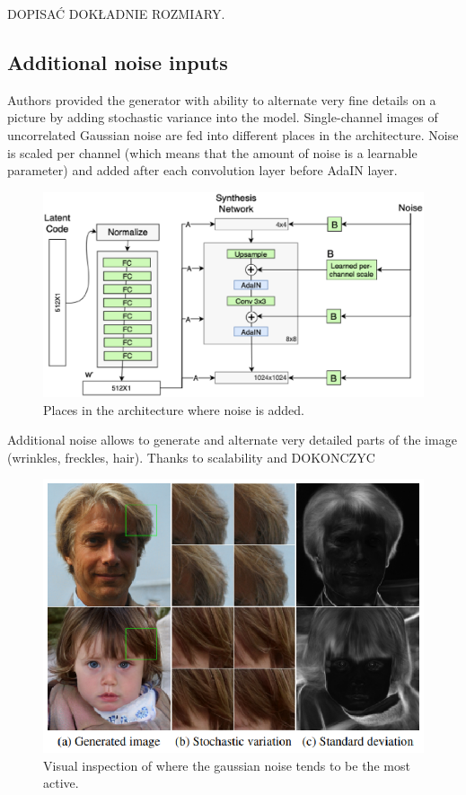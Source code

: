 \documentclass[12pt,a4paper,openany]{book}
\begin{document}
DOPISAĆ DOKŁADNIE ROZMIARY.

\subsection{Additional noise inputs}

Authors provided the generator with ability to alternate very fine details on a picture by adding stochastic variance into the model. Single-channel images of uncorrelated Gaussian noise are fed into different places in the architecture. Noise is scaled per channel (which means that the amount of noise is a learnable parameter) and added after each convolution layer before AdaIN layer.

\begin{figure}[ht!]
    \centering
    \includegraphics[scale=0.5]{figs/noise.eps}
    \caption{Places in the architecture where noise is added.}\label{Fig:STYLEGAN}
\end{figure}

Additional noise allows to generate and alternate very detailed parts of the image (wrinkles, freckles, hair). Thanks to scalability and DOKONCZYC

\begin{figure}[ht!]
    \centering
    \includegraphics[scale=1.4]{figs/stochastic-variation.eps}
    \caption{Visual inspection of where the gaussian noise tends to be the most active.}\label{Fig:STYLEGAN}
\end{figure}
\end{document}
